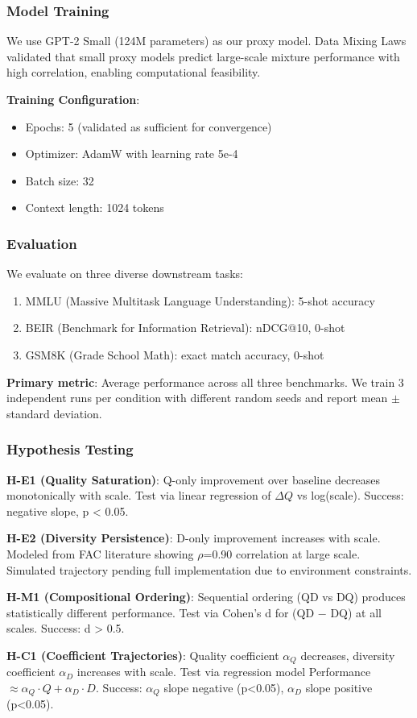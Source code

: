 \subsubsection{Model Training}

We use GPT-2 Small (124M parameters) as our proxy model. Data Mixing Laws validated that small proxy models predict large-scale mixture performance with high correlation, enabling computational feasibility.

\textbf{Training Configuration}:
\begin{itemize}
\item Epochs: 5 (validated as sufficient for convergence)
\item Optimizer: AdamW with learning rate 5e-4
\item Batch size: 32
\item Context length: 1024 tokens
\end{itemize}

\subsubsection{Evaluation}

We evaluate on three diverse downstream tasks:
\begin{enumerate}
\item MMLU (Massive Multitask Language Understanding): 5-shot accuracy
\item BEIR (Benchmark for Information Retrieval): nDCG@10, 0-shot
\item GSM8K (Grade School Math): exact match accuracy, 0-shot
\end{enumerate}

\textbf{Primary metric}: Average performance across all three benchmarks. We train 3 independent runs per condition with different random seeds and report mean $\pm$ standard deviation.

\subsubsection{Hypothesis Testing}

\textbf{H-E1 (Quality Saturation)}: Q-only improvement over baseline decreases monotonically with scale. Test via linear regression of $\Delta Q$ vs log(scale). Success: negative slope, p < 0.05.

\textbf{H-E2 (Diversity Persistence)}: D-only improvement increases with scale. Modeled from FAC literature showing $\rho$=0.90 correlation at large scale. Simulated trajectory pending full implementation due to environment constraints.

\textbf{H-M1 (Compositional Ordering)}: Sequential ordering (QD vs DQ) produces statistically different performance. Test via Cohen's d for (QD $-$ DQ) at all scales. Success: d > 0.5.

\textbf{H-C1 (Coefficient Trajectories)}: Quality coefficient $\alpha _Q$ decreases, diversity coefficient $\alpha _D$ increases with scale. Test via regression model Performance $\approx \alpha _{Q}\cdot Q + \alpha _{D}\cdot D$. Success: $\alpha _Q$ slope negative (p<0.05), $\alpha _D$ slope positive (p<0.05).
